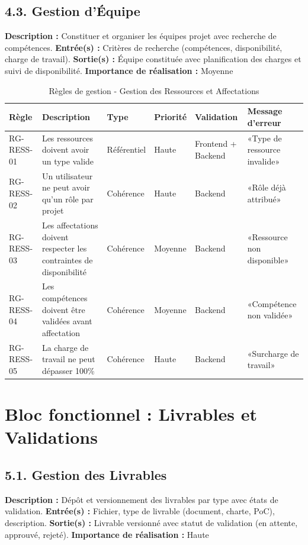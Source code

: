 \subsection{4.3. Gestion d'Équipe}
\textbf{Description :} Constituer et organiser les équipes projet avec recherche de compétences.
\textbf{Entrée(s) :} Critères de recherche (compétences, disponibilité, charge de travail).
\textbf{Sortie(s) :} Équipe constituée avec planification des charges et suivi de disponibilité.
\textbf{Importance de réalisation :} Moyenne

\begin{table}[H]
\centering
\footnotesize
\begin{tabular}{|p{1.5cm}|p{3.5cm}|p{1.5cm}|p{1.5cm}|p{2cm}|p{2.5cm}|}
\hline
\textbf{Règle} & \textbf{Description} & \textbf{Type} & \textbf{Priorité} & \textbf{Validation} & \textbf{Message d'erreur} \\
\hline
RG-RESS-01 & Les ressources doivent avoir un type valide & Référentiel & Haute & Frontend + Backend & «Type de ressource invalide» \\
\hline
RG-RESS-02 & Un utilisateur ne peut avoir qu'un rôle par projet & Cohérence & Haute & Backend & «Rôle déjà attribué» \\
\hline
RG-RESS-03 & Les affectations doivent respecter les contraintes de disponibilité & Cohérence & Moyenne & Backend & «Ressource non disponible» \\
\hline
RG-RESS-04 & Les compétences doivent être validées avant affectation & Cohérence & Moyenne & Backend & «Compétence non validée» \\
\hline
RG-RESS-05 & La charge de travail ne peut dépasser 100\% & Cohérence & Haute & Backend & «Surcharge de travail» \\
\hline
\end{tabular}
\caption{Règles de gestion - Gestion des Ressources et Affectations}
\label{tab:rg_ressources}
\end{table}

\section{Bloc fonctionnel : Livrables et Validations}

\subsection{5.1. Gestion des Livrables}
\textbf{Description :} Dépôt et versionnement des livrables par type avec états de validation.
\textbf{Entrée(s) :} Fichier, type de livrable (document, charte, PoC), description.
\textbf{Sortie(s) :} Livrable versionné avec statut de validation (en attente, approuvé, rejeté).
\textbf{Importance de réalisation :} Haute

